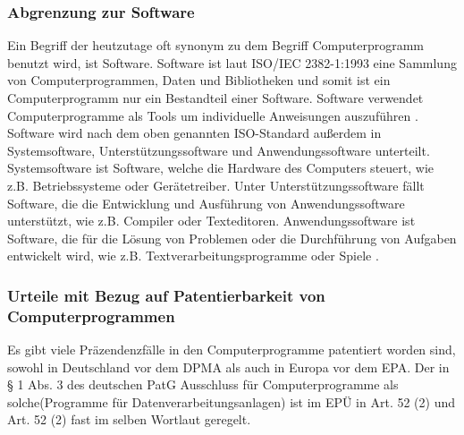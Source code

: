 \subsubsection{Abgrenzung zur Software}
Ein Begriff der heutzutage oft synonym zu dem Begriff Computerprogramm benutzt wird,
ist Software. Software ist 
laut ISO/IEC 2382-1:1993 eine Sammlung von Computerprogrammen, 
Daten und Bibliotheken und 
somit ist ein Computerprogramm nur ein Bestandteil einer Software.
Software verwendet Computerprogramme 
als Tools um individuelle Anweisungen auszuführen 
\cite{ComputerProgrammeUnverzichtbareComputerprogramme}.
Software wird nach dem oben genannten ISO-Standard außerdem in 
Systemsoftware, Unterstützungssoftware und Anwendungssoftware unterteilt.
Systemsoftware ist Software, welche die Hardware des Computers steuert, 
wie z.B. Betriebssysteme oder Gerätetreiber. Unter Unterstützungssoftware 
fällt Software, die die Entwicklung und Ausführung von Anwendungssoftware
unterstützt, wie z.B. Compiler oder Texteditoren. Anwendungssoftware ist
Software, die für die Lösung von Problemen oder die Durchführung von Aufgaben
entwickelt wird, wie z.B. Textverarbeitungsprogramme oder Spiele
\cite{instituteofelectricalandelectronicsengineersinc.ISO47652010}.
\\

\subsubsection{Urteile mit Bezug auf Patentierbarkeit von Computerprogrammen}
Es gibt viele Präzendenzfälle in den Computerprogramme patentiert worden sind, 
sowohl in Deutschland vor dem DPMA als auch in Europa vor dem EPA.
Der in § 1 Abs. 3 des deutschen PatG Ausschluss für Computerprogramme als 
solche(Programme für Datenverarbeitungsanlagen) ist im EPÜ in Art. 52 (2) 
und Art. 52 (2) fast im selben Wortlaut geregelt.

